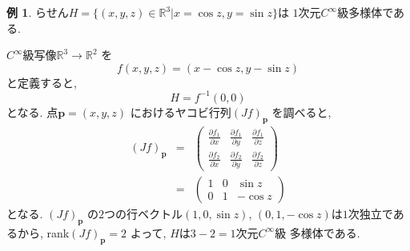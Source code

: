 \documentclass[a4j,12pt]{jarticle}
\theoremstyle{definition}
\newtheorem{example}[theorem]{例}
\begin{document}
\begin{example}
    らせん$H=\{(x,y,z)\in \mathbb{R}^3|
    x=\cos z, y=\sin z\}$は
    $1$次元$C^\infty$級多様体である. 

    $C^\infty$級写像$\mathbb{R}^3\to \mathbb{R}^2$
    を
    $$f(x,y,z)=(x-\cos z,y-\sin z)$$
    と定義すると, 
    $$H=f^{-1}(0,0)$$
    となる. 点$\boldsymbol{p}=(x,y,z)$
    におけるヤコビ行列$(Jf)_{\boldsymbol{p}}$
    を調べると, 
    \begin{eqnarray*}
        (Jf)_{\boldsymbol{p}}&=&
        \left(\begin{array}{ccc}
            \frac{\partial f_1}{\partial x}&
            \frac{\partial f_1}{\partial y}&
            \frac{\partial f_1}{\partial z}\\
            \frac{\partial f_2}{\partial x}&
            \frac{\partial f_2}{\partial y}&
            \frac{\partial f_2}{\partial z}
        \end{array}\right)\\
        &=&
        \left(\begin{array}{ccc}
            1&0&\sin z\\
            0&1&-\cos z
        \end{array}\right)
    \end{eqnarray*}
    となる. $(Jf)_{\boldsymbol{p}}$
    の$2$つの行ベクトル$(1,0,\sin z)$, 
    $(0,1,-\cos z)$は$1$次独立であるから, 
    rank$(Jf)_{\boldsymbol{p}}=2$
    よって, $H$は$3-2=1$次元$C^\infty$級
    多様体である. 
\end{example}
\end{document}

